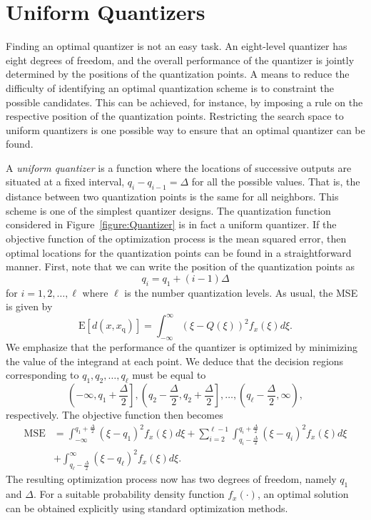 \section{Uniform Quantizers}
\label{section:UniformQuantizers}

Finding an optimal quantizer is not an easy task.
An eight-level quantizer has eight degrees of freedom, and the overall performance of the quantizer is jointly determined by the positions of the quantization points.
A means to reduce the difficulty of identifying an optimal quantization scheme is to constraint the possible candidates.
This can be achieved, for instance, by imposing a rule on the respective position of the quantization points.
Restricting the search space to uniform quantizers is one possible way to ensure that an optimal quantizer can be found.

A \emph{uniform quantizer} is a function where the locations of successive outputs are situated at a fixed interval, $q_i - q_{i-1} = \Delta$ for all the possible values.
That is, the distance between two quantization points is the same for all neighbors.
This scheme is one of the simplest quantizer designs.
The quantization function considered in Figure~\ref{figure:Quantizer} is in fact a uniform quantizer.
If the objective function of the optimization process is the mean squared error, then optimal locations for the quantization points can be found in a straightforward manner.
First, note that we can write the position of the quantization points as
\begin{equation*}
q_i = q_1 + (i-1) \Delta
\end{equation*}
for $i = 1, 2, \ldots, \ell$ where $\ell$ is the number quantization levels.
As usual, the MSE is given by
\begin{equation*}
\mathrm{E} [ d(x, x_{\mathrm{q}}) ]
= \int_{-\infty}^{\infty} (\xi - Q(\xi))^2 f_x(\xi) d\xi .
\end{equation*}
We emphasize  that the performance of the quantizer is optimized by minimizing the value of the integrand at each point.
We deduce that the decision regions corresponding to $q_1, q_2, \ldots, q_{\ell}$ must be equal to
\begin{equation*}
\left( - \infty, q_1 + \frac{\Delta}{2} \right],
\left( q_2 - \frac{\Delta}{2}, q_2 + \frac{\Delta}{2} \right],
\ldots,
\left( q_{\ell} - \frac{\Delta}{2}, \infty \right) ,
\end{equation*}
respectively.
The objective function then becomes
\begin{equation} \label{equation:UniformQuantizerMSE}
\begin{split}
\text{MSE} &= \int_{-\infty}^{q_1 + \frac{\Delta}{2}} (\xi - q_1)^2 f_x(\xi) d\xi
+ \sum_{i=2}^{{\ell}-1}
\int_{q_i - \frac{\Delta}{2}}^{q_i + \frac{\Delta}{2}}
(\xi - q_i)^2 f_x(\xi) d\xi \\
&+ \int_{q_{\ell} - \frac{\Delta}{2}}^{\infty} (\xi - q_{\ell})^2 f_x(\xi) d\xi .
\end{split}
\end{equation}
The resulting optimization process now has two degrees of freedom, namely $q_1$ and $\Delta$.
For a suitable probability density function $f_x(\cdot)$, an optimal solution can be obtained explicitly using standard optimization methods.

